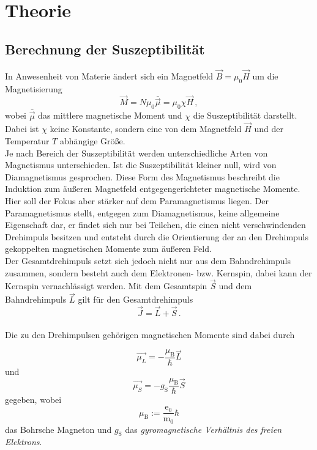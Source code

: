 \section{Theorie}
\label{sec:theorie}

\subsection{Berechnung der Suszeptibilität}

In Anwesenheit von Materie ändert sich ein Magnetfeld $\vec{B} = \mu_0 \vec{H}$ um die Magnetisierung
\begin{equation*}
    \vec{M} = N \mu_0 \bar{\vec{\mu}} = \mu_0 \chi \vec{H} \,,
\end{equation*}
wobei $\bar{\vec{\mu}}$ das mittlere magnetische Moment und $\chi$ die Suszeptibilität darstellt.
Dabei ist $\chi$ keine Konstante, sondern eine von dem Magnetfeld $\vec{H}$ und der Temperatur $T$ abhängige Größe. \\

Je nach Bereich der Suszeptibilität werden unterschiedliche Arten von Magnetismus unterschieden.
Ist die Suszeptibilität kleiner null, wird von Diamagnetismus gesprochen.
Diese Form des Magnetismus beschreibt die Induktion zum äußeren Magnetfeld entgegengerichteter magnetische Momente. \\

Hier soll der Fokus aber stärker auf dem Paramagnetismus liegen.
Der Paramagnetismus stellt, entgegen zum Diamagnetismus, keine allgemeine Eigenschaft dar, er findet sich nur bei
Teilchen, die einen nicht verschwindenden Drehimpuls besitzen und entsteht durch die Orientierung der an den
Drehimpuls gekoppelten magnetischen Momente zum äußeren Feld. \\

Der Gesamtdrehimpuls setzt sich jedoch nicht nur aus dem Bahndrehimpuls zusammen, sondern besteht auch dem
Elektronen- bzw. Kernspin, dabei kann der Kernspin vernachlässigt werden.%
Mit dem Gesamtspin $\vec{S}$ und dem Bahndrehimpuls $\vec{L}$ gilt für den Gesamtdrehimpuls
\begin{equation*}
    \vec{J} = \vec{L} + \vec{S} \,.
\end{equation*} \\

Die zu den Drehimpulsen gehörigen magnetischen Momente sind dabei durch

\begin{equation*}
    \vec{\mu_L} = -\dfrac{\mu_\text{B}}{\hbar} \vec{L}
    \label{eq:magmomL}
\end{equation*}
und
\begin{equation*}
    \vec{\mu_S} = - g_\text{S} \dfrac{\mu_\text{B}}{\hbar} \vec{S}
\end{equation*}
gegeben, wobei
\begin{equation*}
    \mu_\text{B} := \frac{\text{e}_0}{\text{m}_0} \hbar
\end{equation*}
das Bohrsche Magneton und $g_\text{S}$ das \textit{gyromagnetische Verhältnis des freien Elektrons}. \\

